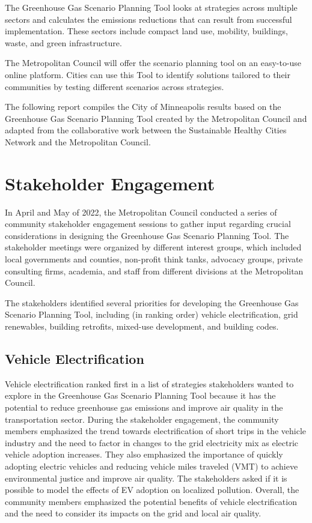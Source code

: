 \documentclass[
]{book}
\begin{document}
The Greenhouse Gas Scenario Planning Tool looks at strategies across multiple sectors and calculates the emissions reductions that can result from successful implementation. These sectors include compact land use, mobility, buildings, waste, and green infrastructure.

The Metropolitan Council will offer the scenario planning tool on an easy-to-use online platform. Cities can use this Tool to identify solutions tailored to their communities by testing different scenarios across strategies.

The following report compiles the City of Minneapolis results based on the Greenhouse Gas Scenario Planning Tool created by the Metropolitan Council and adapted from the collaborative work between the Sustainable Healthy Cities Network and the Metropolitan Council.

\hypertarget{stakeholder-engagement}{%
\section{Stakeholder Engagement}\label{stakeholder-engagement}}

In April and May of 2022, the Metropolitan Council conducted a series of community stakeholder engagement sessions to gather input regarding crucial considerations in designing the Greenhouse Gas Scenario Planning Tool. The stakeholder meetings were organized by different interest groups, which included local governments and counties, non-profit think tanks, advocacy groups, private consulting firms, academia, and staff from different divisions at the Metropolitan Council.

The stakeholders identified several priorities for developing the Greenhouse Gas Scenario Planning Tool, including (in ranking order) vehicle electrification, grid renewables, building retrofits, mixed-use development, and building codes.

\hypertarget{vehicle-electrification}{%
\subsection{Vehicle Electrification}\label{vehicle-electrification}}

Vehicle electrification ranked first in a list of strategies stakeholders wanted to explore in the Greenhouse Gas Scenario Planning Tool because it has the potential to reduce greenhouse gas emissions and improve air quality in the transportation sector. During the stakeholder engagement, the community members emphasized the trend towards electrification of short trips in the vehicle industry and the need to factor in changes to the grid electricity mix as electric vehicle adoption increases. They also emphasized the importance of quickly adopting electric vehicles and reducing vehicle miles traveled (VMT) to achieve environmental justice and improve air quality. The stakeholders asked if it is possible to model the effects of EV adoption on localized pollution. Overall, the community members emphasized the potential benefits of vehicle electrification and the need to consider its impacts on the grid and local air quality.
\end{document}
